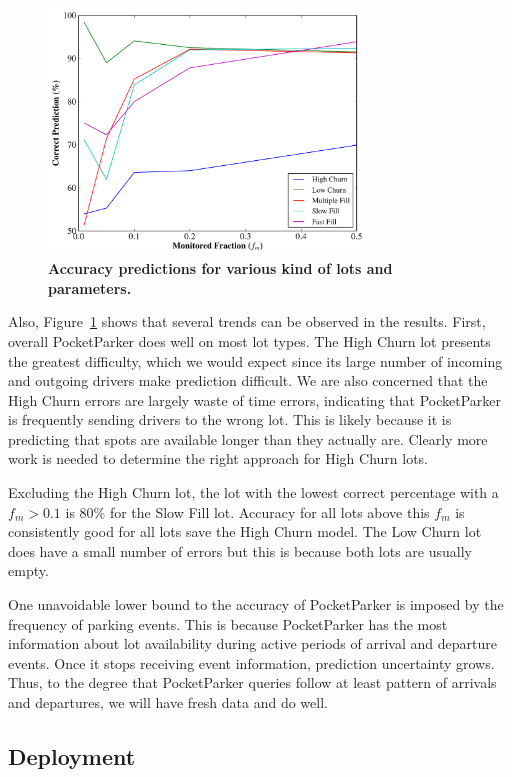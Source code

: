 \begin{figure}[t]
\centering
\includegraphics[width=3.325in]{./simulator/figures/accuracy_graph.pdf}

\caption{\textbf{Accuracy predictions for various kind of lots and parameters.}}
\label{fig-accuracy}
\end{figure}

Also, Figure~\ref{fig-accuracy} shows that several trends can be observed 
in the results. First, overall PocketParker does well on most lot types. 
The High Churn lot presents the greatest difficulty, which we would expect 
since its large number of incoming and outgoing drivers make prediction 
difficult. We are also concerned that the High Churn errors are largely 
waste of time errors, indicating that PocketParker is frequently sending 
drivers to the wrong lot.  This is likely because it is predicting that 
spots are available longer than they actually are. Clearly more work is 
needed to determine the right approach for High Churn lots.

Excluding the High Churn lot, the lot with the lowest correct percentage with
a $f_m > 0.1$ is 80\% for the Slow Fill lot.  Accuracy for all lots above
this $f_m$ is consistently good for all lots save the High Churn model.  The
Low Churn lot does have a small number of errors but this is because both lots
are usually empty.

One unavoidable lower bound to the accuracy of PocketParker is imposed by the
frequency of parking events.  This is because PocketParker has the most
information about lot availability during active periods of arrival and
departure events. Once it stops receiving event information, prediction
uncertainty grows.  Thus, to the degree that PocketParker queries follow at
least pattern of arrivals and departures, we will have fresh data and do well.

\subsection{Deployment}


